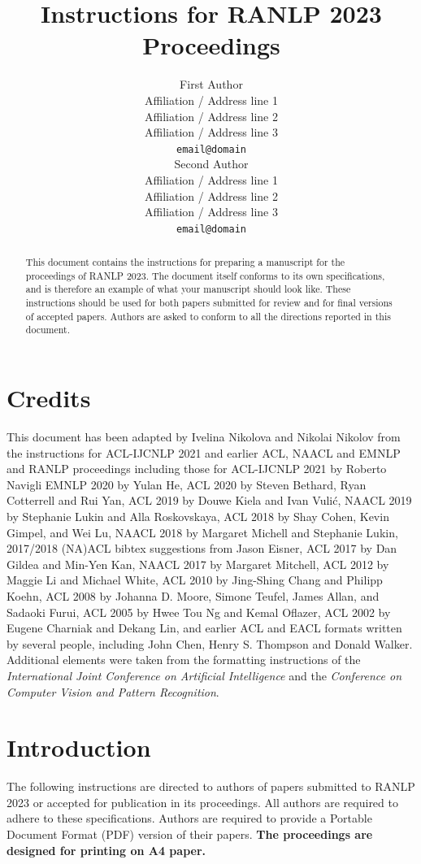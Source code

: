 \documentclass[11pt,a4paper]{article}
\title{Instructions for RANLP 2023 Proceedings}
\author{First Author \\
  Affiliation / Address line 1 \\
  Affiliation / Address line 2 \\
  Affiliation / Address line 3 \\
  \texttt{email@domain} \\\And
  Second Author \\
  Affiliation / Address line 1 \\
  Affiliation / Address line 2 \\
  Affiliation / Address line 3 \\
  \texttt{email@domain} \\}
\date{}
\begin{document}
\maketitle
\begin{abstract}
This document contains the instructions for preparing a manuscript for the proceedings of RANLP 2023.
The document itself conforms to its own specifications, and is therefore an example of what your manuscript should look like.
These instructions should be used for both papers submitted for review and for final versions of accepted papers.
Authors are asked to conform to all the directions reported in this document.
\end{abstract}

\section{Credits}

This document has been adapted by Ivelina Nikolova and Nikolai Nikolov from the instructions for ACL-IJCNLP 2021 and earlier ACL, NAACL and EMNLP and RANLP proceedings including those for 
ACL-IJCNLP 2021 by Roberto Navigli
EMNLP 2020 by Yulan He,
ACL 2020 by Steven Bethard, Ryan Cotterrell and Rui Yan, 
ACL 2019 by Douwe Kiela and Ivan Vuli\'{c},
NAACL 2019 by Stephanie Lukin and Alla Roskovskaya, 
ACL 2018 by Shay Cohen, Kevin Gimpel, and Wei Lu, 
NAACL 2018 by Margaret Michell and Stephanie Lukin,
2017/2018 (NA)ACL bibtex suggestions from Jason Eisner,
ACL 2017 by Dan Gildea and Min-Yen Kan, 
NAACL 2017 by Margaret Mitchell, 
ACL 2012 by Maggie Li and Michael White, 
ACL 2010 by Jing-Shing Chang and Philipp Koehn, 
ACL 2008 by Johanna D. Moore, Simone Teufel, James Allan, and Sadaoki Furui, 
ACL 2005 by Hwee Tou Ng and Kemal Oflazer, 
ACL 2002 by Eugene Charniak and Dekang Lin, 
and earlier ACL and EACL formats written by several people, including
John Chen, Henry S. Thompson and Donald Walker.
Additional elements were taken from the formatting instructions of the \emph{International Joint Conference on Artificial Intelligence} and the \emph{Conference on Computer Vision and Pattern Recognition}.

\section{Introduction}

The following instructions are directed to authors of papers submitted to RANLP 2023 or accepted for publication in its proceedings.
All authors are required to adhere to these specifications.
Authors are required to provide a Portable Document Format (PDF) version of their papers.
\textbf{The proceedings are designed for printing on A4 paper.}
\end{document}
